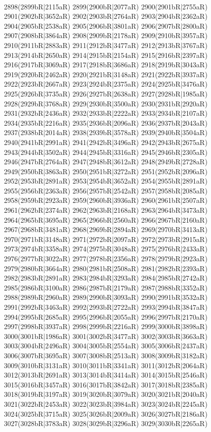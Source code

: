 \\2898(2899bR|2115aR) 2899(2900bR|2077aR) 2900(2901bR|2755aR) 2901(2902bR|3652aR) 2902(2903bR|2764aR) 2903(2904bR|2362aR) 2904(2905bR|2538aR) 2905(2906bR|3801aR) 2906(2907bR|2800aR) \\2907(2908bR|3864aR) 2908(2909bR|2178aR) 2909(2910bR|3957aR) 2910(2911bR|2883aR) 2911(2912bR|3477aR) 2912(2913bR|3767aR) 2913(2914bR|2650aR) 2914(2915bR|2154aR) 2915(2916bR|2397aR) \\2916(2917bR|3069aR) 2917(2918bR|3686aR) 2918(2919bR|3043aR) 2919(2920bR|2462aR) 2920(2921bR|3148aR) 2921(2922bR|3937aR) 2922(2923bR|2667aR) 2923(2924bR|2375aR) 2924(2925bR|3476aR) \\2925(2926bR|3735aR) 2926(2927bR|2638aR) 2927(2928bR|1985aR) 2928(2929bR|3768aR) 2929(2930bR|3500aR) 2930(2931bR|2920aR) 2931(2932bR|2436aR) 2932(2933bR|2222aR) 2933(2934bR|2107aR) \\2934(2935bR|2216aR) 2935(2936bR|2096aR) 2936(2937bR|2043aR) 2937(2938bR|2014aR) 2938(2939bR|3578aR) 2939(2940bR|3504aR) 2940(2941bR|2991aR) 2941(2942bR|3496aR) 2942(2943bR|2675aR) \\2943(2944bR|3502aR) 2944(2945bR|3316aR) 2945(2946bR|2305aR) 2946(2947bR|2764aR) 2947(2948bR|3612aR) 2948(2949bR|2728aR) 2949(2950bR|3863aR) 2950(2951bR|3272aR) 2951(2952bR|2096aR) \\2952(2953bR|2891aR) 2953(2954bR|3652aR) 2954(2955bR|2891aR) 2955(2956bR|2363aR) 2956(2957bR|2542aR) 2957(2958bR|2085aR) 2958(2959bR|2923aR) 2959(2960bR|3936aR) 2960(2961bR|2507aR) \\2961(2962bR|2374aR) 2962(2963bR|2168aR) 2963(2964bR|3473aR) 2964(2965bR|3695aR) 2965(2966bR|2560aR) 2966(2967bR|2160aR) 2967(2968bR|3481aR) 2968(2969bR|2894aR) 2969(2970bR|3413aR) \\2970(2971bR|3148aR) 2971(2972bR|2097aR) 2972(2973bR|2915aR) 2973(2974bR|3358aR) 2974(2975bR|3048aR) 2975(2976bR|2433aR) 2976(2977bR|3022aR) 2977(2978bR|2356aR) 2978(2979bR|2923aR) \\2979(2980bR|3664aR) 2980(2981bR|2508aR) 2981(2982bR|2393aR) 2982(2983bR|2891aR) 2983(2984bR|3293aR) 2984(2985bR|2742aR) 2985(2986bR|3100aR) 2986(2987bR|2179aR) 2987(2988bR|3352aR) \\2988(2989bR|2960aR) 2989(2990bR|3093aR) 2990(2991bR|3532aR) 2991(2992bR|3463aR) 2992(2993bR|2722aR) 2993(2994bR|3847aR) 2994(2995bR|2685aR) 2995(2996bR|2055aR) 2996(2997bR|2170aR) \\2997(2998bR|3937aR) 2998(2999bR|2216aR) 2999(3000bR|3898aR) 3000(3001bR|1986aR) 3001(3002bR|3477aR) 3002(3003bR|3663aR) 3003(3004bR|2496aR) 3004(3005bR|2554aR) 3005(3006bR|2437aR) \\3006(3007bR|3695aR) 3007(3008bR|2513aR) 3008(3009bR|3182aR) 3009(3010bR|3131aR) 3010(3011bR|3341aR) 3011(3012bR|2064aR) 3012(3013bR|2691aR) 3013(3014bR|3414aR) 3014(3015bR|2546aR) \\3015(3016bR|3457aR) 3016(3017bR|3842aR) 3017(3018bR|2385aR) 3018(3019bR|3197aR) 3019(3020bR|3079aR) 3020(3021bR|2040aR) 3021(3022bR|2453aR) 3022(3023bR|3984aR) 3023(3024bR|2245aR) \\3024(3025bR|3715aR) 3025(3026bR|2009aR) 3026(3027bR|2186aR) 3027(3028bR|3783aR) 3028(3029bR|3296aR) 3029(3030bR|2265aR) 